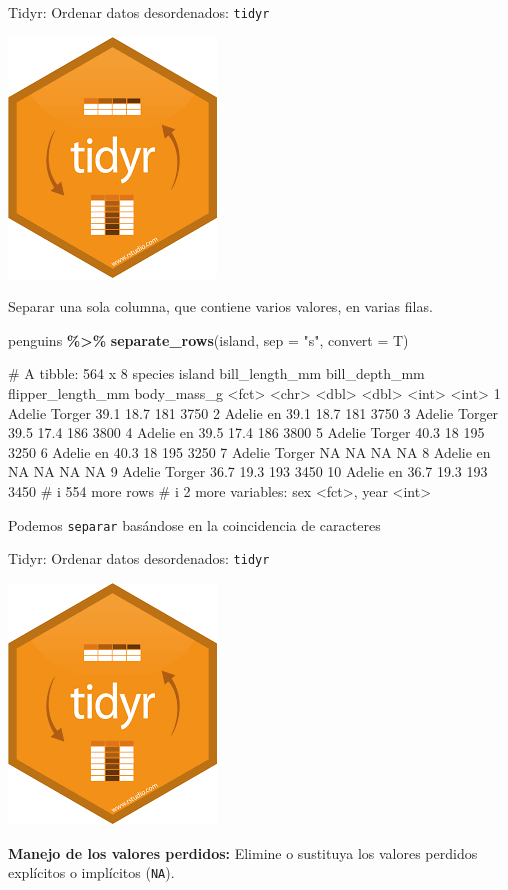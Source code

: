 \documentclass[
  ignorenonframetext,
  aspectratio=169]{beamer}
\newenvironment{Shaded}{\begin{snugshade}}{\end{snugshade}}
\newcommand{\AttributeTok}[1]{\textcolor[rgb]{0.13,0.29,0.53}{#1}}
\newcommand{\FunctionTok}[1]{\textcolor[rgb]{0.13,0.29,0.53}{\textbf{#1}}}
\newcommand{\NormalTok}[1]{#1}
\newcommand{\SpecialCharTok}[1]{\textcolor[rgb]{0.81,0.36,0.00}{\textbf{#1}}}
\newcommand{\StringTok}[1]{\textcolor[rgb]{0.31,0.60,0.02}{#1}}
\let\oldverbatim\verbatim
\let\endoldverbatim\endverbatim
\renewenvironment{verbatim}{\tiny\oldverbatim}{\endoldverbatim}
\begin{document}
\begin{frame}[fragile]{Tidyr: Ordenar datos desordenados:
\texttt{tidyr}}
\label{tidyr-ordenar-datos-desordenados-tidyr-12}
\begin{flushright}\includegraphics[width=0.05\linewidth]{Imgs/logo_tidyr} \end{flushright}

Separar una sola columna, que contiene varios valores, en varias filas.

\begin{Shaded}
\begin{Highlighting}[]
\NormalTok{penguins }\SpecialCharTok{\%\textgreater{}\%} \FunctionTok{separate\_rows}\NormalTok{(island, }\AttributeTok{sep =} \StringTok{"s"}\NormalTok{, }\AttributeTok{convert =}\NormalTok{ T)}
\end{Highlighting}
\end{Shaded}

\begin{verbatim}
# A tibble: 564 x 8
   species island bill_length_mm bill_depth_mm flipper_length_mm body_mass_g
   <fct>   <chr>           <dbl>         <dbl>             <int>       <int>
 1 Adelie  Torger           39.1          18.7               181        3750
 2 Adelie  en               39.1          18.7               181        3750
 3 Adelie  Torger           39.5          17.4               186        3800
 4 Adelie  en               39.5          17.4               186        3800
 5 Adelie  Torger           40.3          18                 195        3250
 6 Adelie  en               40.3          18                 195        3250
 7 Adelie  Torger           NA            NA                  NA          NA
 8 Adelie  en               NA            NA                  NA          NA
 9 Adelie  Torger           36.7          19.3               193        3450
10 Adelie  en               36.7          19.3               193        3450
# i 554 more rows
# i 2 more variables: sex <fct>, year <int>
\end{verbatim}

Podemos \texttt{separar} basándose en la coincidencia de caracteres
\end{frame}

\begin{frame}[fragile]{Tidyr: Ordenar datos desordenados:
\texttt{tidyr}}
\label{tidyr-ordenar-datos-desordenados-tidyr-13}
\begin{flushright}\includegraphics[width=0.05\linewidth]{Imgs/logo_tidyr} \end{flushright}

\textbf{Manejo de los valores perdidos:} Elimine o sustituya los valores
perdidos explícitos o implícitos (\texttt{NA}).
\end{frame}
\end{document}
